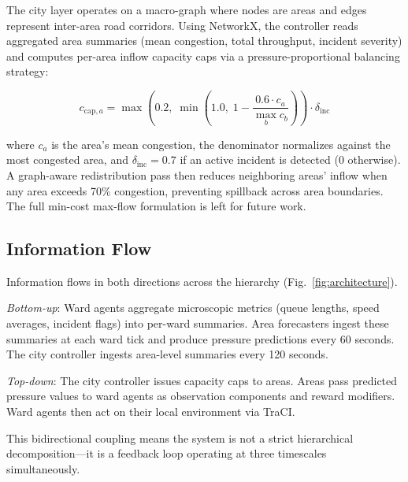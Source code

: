 \documentclass[conference]{IEEEtran}
\begin{document}
The city layer operates on a macro-graph where nodes are areas and edges
represent inter-area road corridors. Using NetworkX, the controller reads
aggregated area summaries (mean congestion, total throughput, incident
severity) and computes per-area inflow capacity caps via a
pressure-proportional balancing strategy:

\begin{equation}
c_{\text{cap},a} = \max\!\left(0.2,\; \min\!\left(1.0,\;
1 - \frac{0.6 \cdot c_a}{\max_b c_b}\right)\right) \cdot \delta_{\text{inc}}
\label{eq:city_cap}
\end{equation}

where $c_a$ is the area's mean congestion, the denominator normalizes
against the most congested area, and $\delta_{\text{inc}} = 0.7$ if an
active incident is detected (0 otherwise). A graph-aware redistribution
pass then reduces neighboring areas' inflow when any area exceeds 70\%
congestion, preventing spillback across area boundaries. The full
min-cost max-flow formulation is left for future work.

\subsection{Information Flow}

Information flows in both directions across the hierarchy
(Fig.~\ref{fig:architecture}).

\textit{Bottom-up}: Ward agents aggregate microscopic metrics (queue lengths,
speed averages, incident flags) into per-ward summaries. Area forecasters
ingest these summaries at each ward tick and produce pressure predictions
every 60 seconds. The city controller ingests area-level summaries every
120 seconds.

\textit{Top-down}: The city controller issues capacity caps to areas. Areas
pass predicted pressure values to ward agents as observation components
and reward modifiers. Ward agents then act on their local environment via
TraCI.

This bidirectional coupling means the system is not a strict hierarchical
decomposition---it is a feedback loop operating at three timescales
simultaneously.
\end{document}
